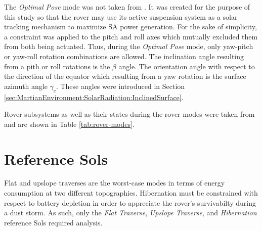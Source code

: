 
The \textit{Optimal Pose} mode was not taken from . It was created for the purpose of this study so that the rover may use its active suspension system as a solar tracking mechanism to maximize \ac{SA} power generation. For the sake of simplicity, a constraint was applied to the pitch and roll axes which mutually excluded them from both being actuated. Thus, during the \textit{Optimal Pose} mode, only yaw-pitch or yaw-roll rotation combinations are allowed. The inclination angle resulting from a pith or roll rotations is the $\beta$ angle. The orientation angle with respect to the direction of the equator which resulting from a yaw rotation is the surface azimuth angle $\gamma_{c}$. These angles were introduced in Section \ref{sec:MartianEnvironment:SolarRadiation:InclinedSurface}.

Rover subsystems as well as their states during the rover modes were taken from  and are shown in Table \ref{tab:rover-modes}.






\section{Reference Sols}
\label{sec:ReferenceSols:ReferenceSols}
Flat and upslope traverses are the worst-case modes in terms of energy consumption at two different topographies. Hibernation must be constrained with respect to battery depletion in order to appreciate the rover's survivabilty during a dust storm. As such, only the \textit{Flat Traverse}, \textit{Upslope Traverse}, and \textit{Hibernation} reference Sols required analysis.


